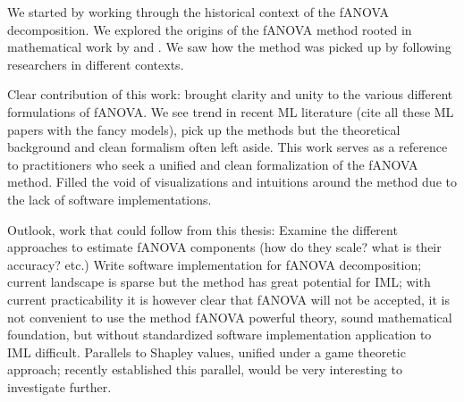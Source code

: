 We started by working through the historical context of the fANOVA decomposition. We explored the origins of the fANOVA method rooted in mathematical work by \cite{hoeffding1948} and \cite{sobol1993sensitivity}. We saw how the method was picked up by following researchers in different contexts.







Clear contribution of this work: brought clarity and unity to the various different formulations of fANOVA. We see trend in recent ML literature (cite all these ML papers with the fancy models), pick up the methods but the theoretical background and clean formalism often left aside. This work serves as a reference to practitioners who seek a unified and clean formalization of the fANOVA method.
Filled the void of visualizations and intuitions around the method due to the lack of software implementations.

Outlook, work that could follow from this thesis:
Examine the different approaches to estimate fANOVA components (how do they scale? what is their accuracy? etc.)
Write software implementation for fANOVA decomposition; current landscape is sparse but the method has great potential for IML; with current practicability it is however clear that fANOVA will not be accepted, it is not convenient to use the method
fANOVA powerful theory, sound mathematical foundation, but without standardized software implementation application to IML difficult.
Parallels to Shapley values, unified under a game theoretic approach; \cite{fumagalli2025} recently established this parallel, would be very interesting to investigate further.

